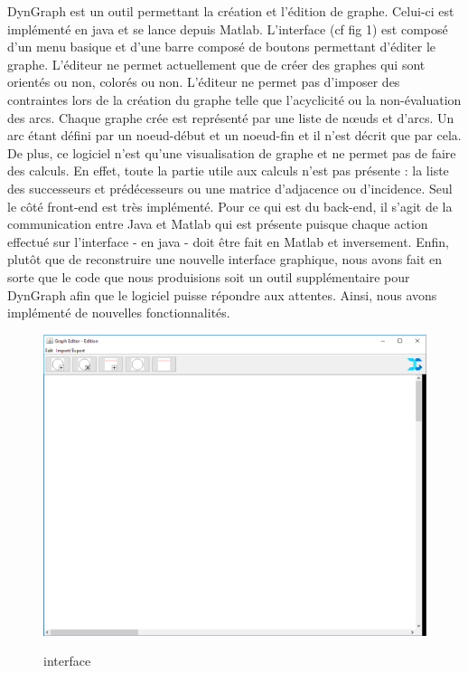 \documentclass[conference]{IEEEtran}
\begin{document}
DynGraph est un outil permettant la création et l'édition de graphe. Celui-ci est implémenté en java et se lance depuis Matlab.
L'interface (cf fig 1) est composé d'un menu basique et d'une barre composé de boutons permettant d'éditer le graphe. L'éditeur ne permet actuellement que de créer des graphes qui sont orientés ou non, colorés ou non. L'éditeur ne permet pas d'imposer des contraintes lors de la création du graphe telle que l'acyclicité ou la non-évaluation des arcs. Chaque graphe crée est représenté par une liste de nœuds et d'arcs. Un arc étant défini par un noeud-début et un noeud-fin et il n'est décrit que par cela. De plus, ce logiciel n'est qu'une visualisation de graphe et ne permet pas de faire des calculs. En effet, toute la partie utile aux calculs n'est pas présente : la liste des successeurs et prédécesseurs ou une matrice d'adjacence ou d'incidence. Seul le côté front-end est très implémenté. Pour ce qui est du back-end, il s'agit de la communication entre Java et Matlab qui est présente puisque chaque action effectué sur l'interface - en java - doit être fait en Matlab et inversement. Enfin, plutôt que de reconstruire une nouvelle interface graphique, nous avons fait en sorte que le code que nous produisions soit un outil supplémentaire pour DynGraph afin que le logiciel puisse répondre aux attentes. Ainsi, nous avons implémenté de nouvelles fonctionnalités. 


\begin{figure}[h]
\begin{center}
\includegraphics[scale=0.30]{Dyngraph.png}\\
\caption{interface}
\label{fig 1}
\end{center}
\end{figure}
\end{document}
